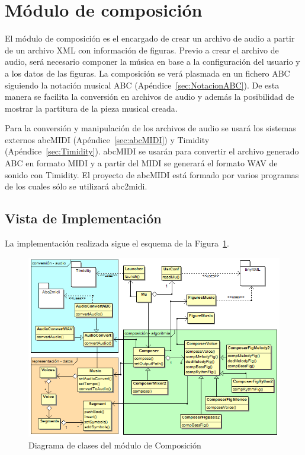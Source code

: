\section{Módulo de composición}
\label{sec:modcomp}


El módulo de composición es el encargado de crear un archivo de audio a partir de un archivo XML con información de figuras. Previo a crear el archivo de audio, será necesario componer la música en base a la configuración del usuario y a los datos de las figuras. La composición se verá plasmada en un fichero ABC siguiendo la notación musical ABC (Apéndice~\ref{sec:NotacionABC}). De esta manera se facilita la conversión en archivos de audio y además la posibilidad de mostrar la partitura de la pieza musical creada.

Para la conversión y manipulación de los archivos de audio se usará los sistemas externos abcMIDI (Apéndice~\ref{sec:abcMIDI}) y Timidity (Apéndice~\ref{sec:Timidity}). abcMIDI se usarán para convertir el archivo generado ABC en formato MIDI y a partir del MIDI se generará el formato WAV de sonido con Timidity. El proyecto de abcMIDI está formado por varios programas de los cuales sólo se utilizará abc2midi.

\subsection{Vista de Implementación}
La implementación realizada sigue el esquema de la Figura~\ref{fig:diagramaclasesMu}.\\

		\begin{figure}[!htbp]
		\centering
		\hspace*{0.0in}
		\includegraphics[scale=0.56]{graphics/diagramaclasesMU.png}
		\caption{Diagrama de clases del módulo de Composición}
		\label{fig:diagramaclasesMu}
		\end{figure}

